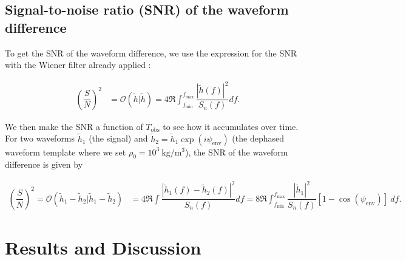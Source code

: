 \documentclass[10pt,a4paper,twoside]{article}
\newcommand{\snr}{\left(\dfrac{S}{N}\right)^2}
\begin{document}
\subsection{Signal-to-noise ratio (SNR) of the waveform difference}
To get the SNR of the waveform difference, we use the expression for the SNR with the Wiener filter already applied \cite{maggiore2008gravitational, Kocsis2011}:

\begin{align}
    \snr &= \mathcal{O}(\tilde{h}|\tilde{h}) = 4 \Re \int_{f_{\text{min}}}^{f_{\text{max}}} \dfrac{|\tilde{h}(f)|^2}{S_n(f)} df.
\end{align}

\noindent We then make the SNR a function of $T_{\text{obs}}$ to see how it accumulates over time. For two waveforms $\tilde{h}_1$ (the signal) and $\tilde{h}_2 = \tilde{h}_1 \exp(i\psi_{\text{env}})$ (the dephased waveform template where we set $\rho_0 = 10^{3} ~\text{kg}/\text{m}^3$), the SNR of the waveform difference is given by

\begin{align}
    \snr = \mathcal{O}(\tilde{h}_1 - \tilde{h}_2|\tilde{h}_1 - \tilde{h}_2) &= 4 \Re \int \dfrac{|\tilde{h}_1(f) - \tilde{h}_2(f)|^2}{S_n(f)} df = 8 \Re \int_{f_{\text{min}}}^{f_{\text{max}}} \dfrac{|\tilde{h}_1|^2}{S_n(f)} [1 - \cos(\psi_{\text{env}})] ~df.
\end{align}

\section{Results and Discussion}\label{sec:rnd}
\end{document}
